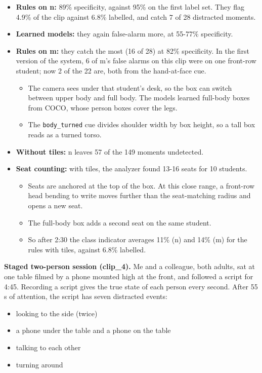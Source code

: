 \begin{itemize}
\tightlist
\item
  \textbf{Rules on n:} 89\% specificity, against 95\% on the first label set. They flag 4.9\% of the clip against 6.8\% labelled, and catch 7 of 28 distracted moments.
\item
  \textbf{Learned models:} they again false-alarm more, at 55-77\% specificity.
\item
  \textbf{Rules on m:} they catch the most (16 of 28) at 82\% specificity. In the first version of the system, 6 of m's false alarms on this clip were on one front-row student; now 2 of the 22 are, both from the hand-at-face cue.

  \begin{itemize}
  \tightlist
  \item
    The camera sees under that student's desk, so the box can switch between upper body and full body. The models learned full-body boxes from COCO, whose person boxes cover the legs.
  \item
    The \texttt{body\_turned} cue divides shoulder width by box height, so a tall box reads as a turned torso.
  \end{itemize}
\item
  \textbf{Without tiles:} n leaves 57 of the 149 moments undetected.
\item
  \textbf{Seat counting:} with tiles, the analyzer found 13-16 seats for 10 students.

  \begin{itemize}
  \tightlist
  \item
    Seats are anchored at the top of the box. At this close range, a front-row head bending to write moves further than the seat-matching radius and opens a new seat.
  \item
    The full-body box adds a second seat on the same student.
  \item
    So after 2:30 the class indicator averages 11\% (n) and 14\% (m) for the rules with tiles, against 6.8\% labelled.
  \end{itemize}
\end{itemize}

\textbf{Staged two-person session (clip\_4).} Me and a colleague, both adults, sat at one table filmed by a phone mounted high at the front, and followed a script for 4:45. Recording a script gives the true state of each person every second. After 55 s of attention, the script has seven distracted events:

\begin{itemize}
\tightlist
\item
  looking to the side (twice)
\item
  a phone under the table and a phone on the table
\item
  talking to each other
\item
  turning around
\end{itemize}

